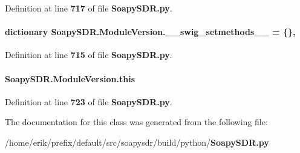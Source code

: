 Definition at line {\bf 717} of file {\bf Soapy\+S\+D\+R.\+py}.

\paragraph[{\+\_\+\+\_\+swig\+\_\+setmethods\+\_\+\+\_\+}]{\setlength{\rightskip}{0pt plus 5cm}dictionary Soapy\+S\+D\+R.\+Module\+Version.\+\_\+\+\_\+swig\+\_\+setmethods\+\_\+\+\_\+ = \{\}\hspace{0.3cm}{\ttfamily [static]}, {\ttfamily [private]}}\label{classSoapySDR_1_1ModuleVersion_a379e8cae5ebc4d387e4e5ae7a63568d6}


Definition at line {\bf 715} of file {\bf Soapy\+S\+D\+R.\+py}.

\paragraph[{this}]{\setlength{\rightskip}{0pt plus 5cm}Soapy\+S\+D\+R.\+Module\+Version.\+this}\label{classSoapySDR_1_1ModuleVersion_af884689aac303ff6feb5cc9368c8c06b}


Definition at line {\bf 723} of file {\bf Soapy\+S\+D\+R.\+py}.



The documentation for this class was generated from the following file\+:\begin{DoxyCompactItemize}
\item 
/home/erik/prefix/default/src/soapysdr/build/python/{\bf Soapy\+S\+D\+R.\+py}\end{DoxyCompactItemize}
